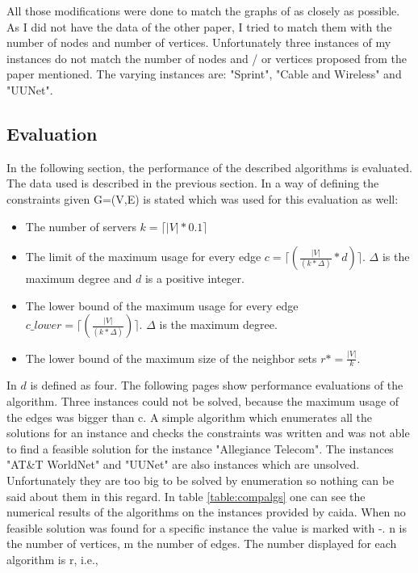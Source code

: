\documentclass [12pt]{article}
\begin{document}
  All those modifications were done to match the graphs of \cite{mirrorserver} as closely as possible.
  As I did not have the data of the other paper, I tried to match them with the number of
  nodes and number of vertices. Unfortunately three instances of my instances do not
  match the number of nodes and / or vertices proposed from the paper mentioned.
  The varying instances are: "Sprint", "Cable and Wireless" and "UUNet".

  \subsection{Evaluation}
  In the following section, the performance of the described algorithms is evaluated. The data used is described in the previous section.
  In \cite{mirrorserver} a way of defining the constraints given G=(V,E) is stated which was used for this evaluation as well: 
  \begin{itemize}
    \item{The number of servers $k = \lceil |V| * 0.1 \rceil$  }
    \item{The limit of the maximum usage for every edge $c = \lceil(\frac{|V|}{(k*\Delta)}*d)\rceil$. $\Delta$ is the maximum degree and $d$ is a positive integer.}
    \item{The lower bound of the maximum usage for every edge $c\_lower = \lceil(\frac{|V|}{(k*\Delta)})\rceil$. $\Delta$ is the maximum degree.}
    \item{The lower bound of the maximum size of the neighbor sets $r*=\frac{|V|}{k}$.}
  \end{itemize}
  In \cite{mirrorserver} $d$ is defined as four. %
  The following pages show performance evaluations of the algorithm.  Three instances could not be solved, because the maximum usage of the 
  edges was bigger than c. A simple algorithm which enumerates all the solutions for an instance and checks the constraints was written and was not able to find a feasible solution 
  for the instance "Allegiance Telecom". The instances  "AT\&T WorldNet" and "UUNet" are also instances which are unsolved. Unfortunately they are too big to be solved by enumeration so
  nothing can be said about them in this regard. In table \ref{table:compalgs} one can see the numerical results of the algorithms on the instances provided by caida. When no
  feasible solution was found for a specific instance the value is marked with -. n is the number of vertices, m the number of edges. The number displayed for each algorithm is r, i.e.,%
\end{document}
